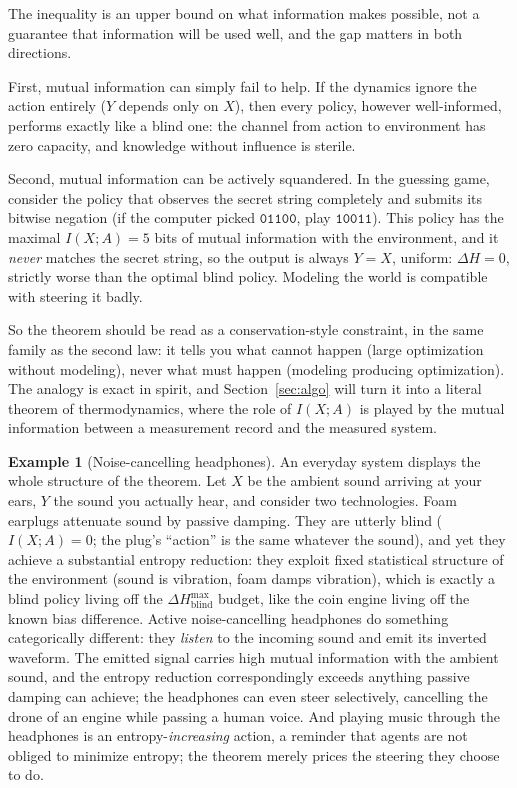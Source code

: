 \documentclass[10pt]{article}
\theoremstyle{definition}
\newtheorem{example}[theorem]{Example}
\theoremstyle{remark}
\begin{document}
The inequality is an upper bound on what information makes possible, not a guarantee that information will be used well, and the gap matters in both directions.

First, mutual information can simply fail to help. If the dynamics ignore the action entirely ($Y$ depends only on $X$), then every policy, however well-informed, performs exactly like a blind one: the channel from action to environment has zero capacity, and knowledge without influence is sterile.

Second, mutual information can be actively squandered. In the guessing game, consider the policy that observes the secret string completely and submits its bitwise negation (if the computer picked $\texttt{01100}$, play $\texttt{10011}$). This policy has the maximal $I(X;A) = 5$ bits of mutual information with the environment, and it \emph{never} matches the secret string, so the output is always $Y = X$, uniform: $\Delta H = 0$, strictly worse than the optimal blind policy. Modeling the world is compatible with steering it badly.

So the theorem should be read as a conservation-style constraint, in the same family as the second law: it tells you what cannot happen (large optimization without modeling), never what must happen (modeling producing optimization). The analogy is exact in spirit, and Section~\ref{sec:algo} will turn it into a literal theorem of thermodynamics, where the role of $I(X;A)$ is played by the mutual information between a measurement record and the measured system.

\begin{example}[Noise-cancelling headphones]
\label{ex:headphones}
An everyday system displays the whole structure of the theorem. Let $X$ be the ambient sound arriving at your ears, $Y$ the sound you actually hear, and consider two technologies. Foam earplugs attenuate sound by passive damping. They are utterly blind ($I(X;A) = 0$; the plug's ``action'' is the same whatever the sound), and yet they achieve a substantial entropy reduction: they exploit fixed statistical structure of the environment (sound is vibration, foam damps vibration), which is exactly a blind policy living off the $\Delta H^{\max}_{\text{blind}}$ budget, like the coin engine living off the known bias difference. Active noise-cancelling headphones do something categorically different: they \emph{listen} to the incoming sound and emit its inverted waveform. The emitted signal carries high mutual information with the ambient sound, and the entropy reduction correspondingly exceeds anything passive damping can achieve; the headphones can even steer selectively, cancelling the drone of an engine while passing a human voice. And playing music through the headphones is an entropy-\emph{increasing} action, a reminder that agents are not obliged to minimize entropy; the theorem merely prices the steering they choose to do.
\end{example}
\end{document}
